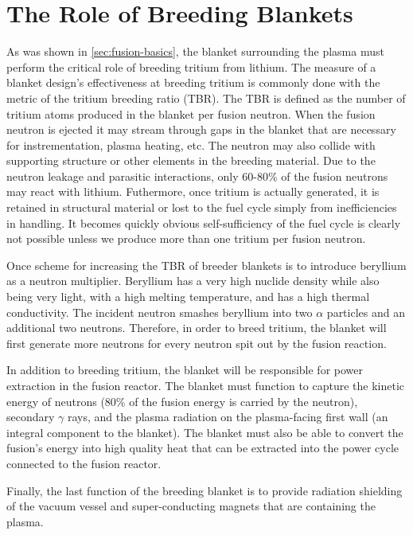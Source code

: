 \section{The Role of Breeding Blankets}
As was shown in \cref{sec:fusion-basics}, the blanket surrounding the plasma must perform the critical role of breeding tritium from lithium. The measure of a blanket design's effectiveness at breeding tritium is commonly done with the metric of the tritium breeding ratio (TBR). The TBR is defined as the number of tritium atoms produced in the blanket per fusion neutron. When the fusion neutron is ejected it may stream through gaps in the blanket that are necessary for instrementation, plasma heating, etc. The neutron may also collide with supporting structure or other elements in the breeding material. Due to the neutron leakage and parasitic interactions, only 60-80\% of the fusion neutrons may react with lithium. Futhermore, once tritium is actually generated, it is retained in structural material or lost to the fuel cycle simply from inefficiencies in handling. It becomes quickly obvious self-sufficiency of the fuel cycle is clearly not possible unless we produce more than one tritium per fusion neutron. 

Once scheme for increasing the TBR of breeder blankets is to introduce beryllium as a neutron multiplier. Beryllium has a very high nuclide density while also being very light, with a high melting temperature, and has a high thermal conductivity. The incident neutron smashes beryllium into two $\alpha$ particles and an additional two neutrons. Therefore, in order to breed tritium, the blanket will first generate more neutrons for every neutron spit out by the fusion reaction.

In addition to breeding tritium, the blanket will be responsible for power extraction in the fusion reactor. The blanket must function to capture the kinetic energy of neutrons (80\% of the fusion energy is carried by the neutron), secondary $\gamma$ rays, and the plasma radiation on the plasma-facing first wall (an integral component to the blanket). The blanket must also be able to convert the fusion's energy into high quality heat that can be extracted into the power cycle connected to the fusion reactor. 

Finally, the last function of the breeding blanket is to provide radiation shielding of the vacuum vessel and super-conducting magnets that are containing the plasma. 